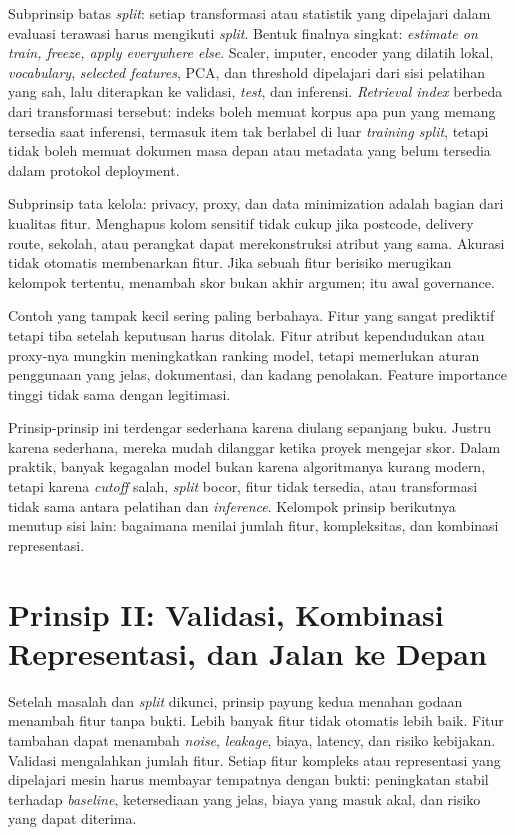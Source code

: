 Subprinsip batas \emph{split}: setiap transformasi atau statistik yang dipelajari dalam evaluasi terawasi harus mengikuti \emph{split}. Bentuk finalnya singkat: \emph{estimate on train, freeze, apply everywhere else}. Scaler, imputer, encoder yang dilatih lokal, \emph{vocabulary}, \emph{selected features}, PCA, dan threshold dipelajari dari sisi pelatihan yang sah, lalu diterapkan ke validasi, \emph{test}, dan inferensi. \emph{Retrieval index} berbeda dari transformasi tersebut: indeks boleh memuat korpus apa pun yang memang tersedia saat inferensi, termasuk item tak berlabel di luar \emph{training split}, tetapi tidak boleh memuat dokumen masa depan atau metadata yang belum tersedia dalam protokol deployment.

Subprinsip tata kelola: privacy, proxy, dan data minimization adalah bagian dari kualitas fitur. Menghapus kolom sensitif tidak cukup jika postcode, delivery route, sekolah, atau perangkat dapat merekonstruksi atribut yang sama. Akurasi tidak otomatis membenarkan fitur. Jika sebuah fitur berisiko merugikan kelompok tertentu, menambah skor bukan akhir argumen; itu awal governance.

Contoh yang tampak kecil sering paling berbahaya. Fitur yang sangat prediktif tetapi tiba setelah keputusan harus ditolak. Fitur atribut kependudukan atau proxy-nya mungkin meningkatkan ranking model, tetapi memerlukan aturan penggunaan yang jelas, dokumentasi, dan kadang penolakan. Feature importance tinggi tidak sama dengan legitimasi.

Prinsip-prinsip ini terdengar sederhana karena diulang sepanjang buku. Justru karena sederhana, mereka mudah dilanggar ketika proyek mengejar skor. Dalam praktik, banyak kegagalan model bukan karena algoritmanya kurang modern, tetapi karena \emph{cutoff} salah, \emph{split} bocor, fitur tidak tersedia, atau transformasi tidak sama antara pelatihan dan \emph{inference}. Kelompok prinsip berikutnya menutup sisi lain: bagaimana menilai jumlah fitur, kompleksitas, dan kombinasi representasi.

\section{Prinsip II: Validasi, Kombinasi Representasi, dan Jalan ke Depan}\label{prinsip-ii-validasi-kombinasi-representasi-dan-jalan-ke-depan}

Setelah masalah dan \emph{split} dikunci, prinsip payung kedua menahan godaan menambah fitur tanpa bukti. Lebih banyak fitur tidak otomatis lebih baik. Fitur tambahan dapat menambah \emph{noise}, \emph{leakage}, biaya, latency, dan risiko kebijakan. Validasi mengalahkan jumlah fitur. Setiap fitur kompleks atau representasi yang dipelajari mesin harus membayar tempatnya dengan bukti: peningkatan stabil terhadap \emph{baseline}, ketersediaan yang jelas, biaya yang masuk akal, dan risiko yang dapat diterima.

